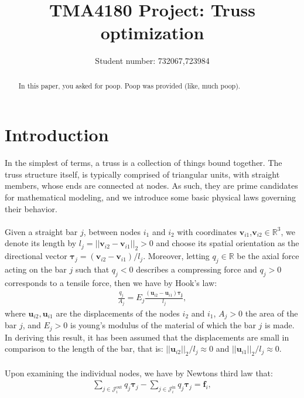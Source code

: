 \documentclass[10pt,a4paper]{article}
\begin{document}
\title{TMA4180 Project: Truss optimization}
\author{Student number: 732067,723984}
\maketitle
\begin{abstract}
\noindent
In this paper, you asked for poop. Poop was provided (like, much poop).
\end{abstract}
\section{Introduction}
In the simplest of terms, a truss is a collection of things bound together. The truss structure itself, is typically comprised of triangular units, with straight members, whose ends are connected at nodes. As such, they are prime candidates for mathematical modeling, and we introduce some basic physical laws governing their behavior.
\\\\
Given a straight bar $j$, between nodes $i_1$ and $i_2$ with coordinates $\boldsymbol{v}_{i1}$,$\boldsymbol{v}_{i2}\in\mathbb{R}^3$, we denote its length by $l_j = ||\boldsymbol{v}_{i2} - \boldsymbol{v}_{i1}||_{2} > 0$ and choose its spatial orientation as the directional vector $\boldsymbol{\tau}_j = (\boldsymbol{v}_{i2}-\boldsymbol{v}_{i1})/l_j$. Moreover, letting $q_j\in\mathbb{R}$ be the axial force acting on the bar $j$ such that $q_j < 0$ describes a compressing force and $q_j > 0$ corresponds to a tensile force, then we have by Hook's law:
\begin{align}
\frac{q_j}{A_j} = E_j\frac{(\boldsymbol{u}_{i2}-\boldsymbol{u}_{i1})\boldsymbol{\tau_j}}{l_j} \label{eq: 1},
\end{align}
where $\boldsymbol{u}_{i2},\boldsymbol{u}_{i1}$ are the displacements of the nodes $i_2$ and $i_1$, $A_j>0$ the area of the bar $j$, and $E_j>0$ is young's modulus of the material of which the bar $j$ is made. In deriving this result, it has been assumed that the displacements are small in comparison to the length of the bar, that is: $||\boldsymbol{u}_{i2}||_2/l_j \approx 0$ and $||\boldsymbol{u}_{i1}||_2/l_j \approx 0$.
\\\\
Upon examining the individual nodes, we have by Newtons third law that:
\begin{align}
\sum_{j\in\mathcal{J}_i^{\text{out}}}q_j\boldsymbol{\tau}_j-\sum_{j\in\mathcal{J}_i^{\text{in}}}q_j\boldsymbol{\tau}_j = \boldsymbol{f}_i \label{eq: 2},
\end{align}
\end{document}
